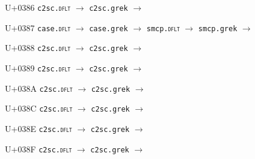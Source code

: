 \documentclass{article}
\begin{document}
\begin{substitutions}

U+0386  \linebreak
    \texttt{c2sc.\textsc{dflt}} $\to$  \linebreak
    \texttt{c2sc.grek} $\to$  

\goodbreak

U+0387  \linebreak
    \texttt{case.\textsc{dflt}} $\to$  \linebreak
    \texttt{case.grek} $\to$  \linebreak
    \texttt{smcp.\textsc{dflt}} $\to$  \linebreak
    \texttt{smcp.grek} $\to$  

\goodbreak

U+0388  \linebreak
    \texttt{c2sc.\textsc{dflt}} $\to$  \linebreak
    \texttt{c2sc.grek} $\to$  

\goodbreak

U+0389  \linebreak
    \texttt{c2sc.\textsc{dflt}} $\to$  \linebreak
    \texttt{c2sc.grek} $\to$  

\goodbreak

U+038A  \linebreak
    \texttt{c2sc.\textsc{dflt}} $\to$  \linebreak
    \texttt{c2sc.grek} $\to$  

\goodbreak

U+038C  \linebreak
    \texttt{c2sc.\textsc{dflt}} $\to$  \linebreak
    \texttt{c2sc.grek} $\to$  

\goodbreak

U+038E  \linebreak
    \texttt{c2sc.\textsc{dflt}} $\to$  \linebreak
    \texttt{c2sc.grek} $\to$  

\goodbreak

U+038F  \linebreak
    \texttt{c2sc.\textsc{dflt}} $\to$  \linebreak
    \texttt{c2sc.grek} $\to$  


\end{substitutions}
\end{document}
